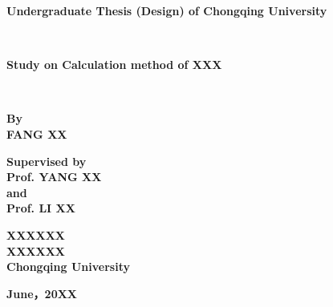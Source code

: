 \cleardoublepage
\pagestyle{empty}
\setmainfont{Times New Roman}
\begin{center}
\textbf{
Undergraduate Thesis (Design) of Chongqing University}
\end{center}
~\\
\begin{center}
\textbf{
Study on Calculation method of XXX }
\end{center}

~\\
\renewcommand{\headrulewidth}{1pt}
\begin{figure}[htb] 
  \centering
     \end{figure}
     

\setmainfont{Times New Roman}
\begin{center}
\textbf{By}  \\
\textbf{FANG XX }
\end{center}

\begin{center}
\textbf{Supervised by}\\
\textbf{Prof. YANG XX}\\
\textbf{and}\\
\textbf{Prof. LI XX}
\end{center}

\begin{center}
\textbf{XXXXXX}\\ %
\textbf{XXXXXX}\\ %
\textbf{Chongqing University}
\end{center}

\begin{center}
\textbf{June，20XX}
\end{center}